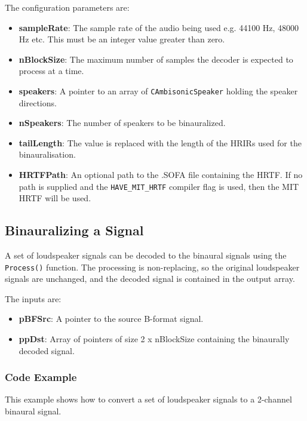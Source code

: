 \documentclass[12pt]{report}
\newcommand{\code}[1]{\texttt{#1}}
\begin{document}
The configuration parameters are:
\begin{itemize}
    \item \textbf{sampleRate}: The sample rate of the audio being used e.g. 44100 Hz, 48000 Hz etc. This must be an integer value greater than zero.
    \item \textbf{nBlockSize}: The maximum number of samples the decoder is expected to process at a time.
    \item \textbf{speakers}: A pointer to an array of \code{CAmbisonicSpeaker} holding the speaker directions.
    \item \textbf{nSpeakers}: The number of speakers to be binauralized.
    \item \textbf{tailLength}: The value is replaced with the length of the HRIRs used for the binauralisation.
    \item \textbf{HRTFPath}: An optional path to the .SOFA file containing the HRTF. If no path is supplied and the \code{HAVE\_MIT\_HRTF} compiler flag is used, then the MIT HRTF will be used.
\end{itemize}

\subsection{Binauralizing a Signal}

A set of loudspeaker signals can be decoded to the binaural signals using the \code{Process()} function. The processing is non-replacing, so the original loudspeaker signals are unchanged, and the decoded signal is contained in the output array.

The inputs are:
\begin{itemize}
    \item \textbf{pBFSrc}: A pointer to the source B-format signal.
    \item \textbf{ppDst}: Array of pointers of size 2 x nBlockSize containing the binaurally decoded signal.
\end{itemize}

\subsubsection{Code Example}

This example shows how to convert a set of loudspeaker signals to a 2-channel binaural signal.
\end{document}
